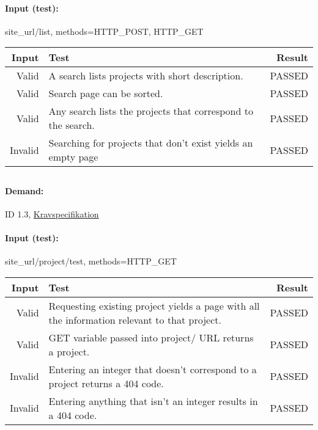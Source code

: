 \documentclass{TDP003mall}
\begin{document}
\paragraph{Input (test):}
site\_url/list, methods=HTTP\_POST, HTTP\_GET

\begin{table}[!h]
\begin{tabularx}{\linewidth}{|r|X|r|}\hline
\textbf{Input} & \textbf{Test} & \textbf{ Result} \\\hline
Valid & A search lists projects with short description. & PASSED \\\hline
Valid & Search page can be sorted.  & PASSED \\\hline
Valid & Any search lists the projects that correspond to the search.  & PASSED \\\hline
Invalid & Searching for projects that don't exist yields an empty page & PASSED \\\hline
\end{tabularx}
\end{table}
\newpage
\subsection{}
\paragraph{Demand: } ID 1.3, \href{https://www.ida.liu.se/~TDP003/current/projekt/dokument/systemspecifikation.pdf}{Kravspecifikation}
\paragraph{Input (test):}
site\_url/project/test,  methods=HTTP\_GET

\begin{table}[!h]
\begin{tabularx}{\linewidth}{|r|X|r|}\hline
\textbf{Input} & \textbf{Test} & \textbf{ Result} \\\hline
Valid & Requesting existing project yields a page with all the information relevant to that project. & PASSED \\\hline
Valid & GET variable passed into  project/ URL returns a project.  & PASSED \\\hline
Invalid & Entering an integer that doesn't correspond to a project returns a 404 code.  & PASSED \\\hline
Invalid & Entering anything that isn't an integer results in a 404 code. & PASSED \\\hline
\end{tabularx}
\end{table}
\end{document}
